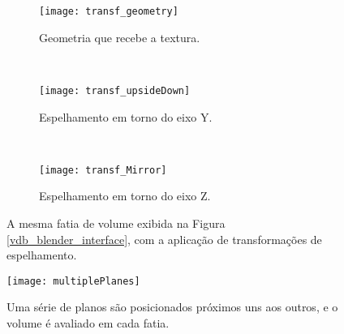 \begin{figure}[!htb]
        \centering
        \begin{subfigure}{0.3\textwidth}
                \texttt{[image: transf\_geometry]}
                \caption{Geometria que recebe a textura.}
                \label{fig:vdb_trans1}
        \end{subfigure}%
        ~ %
        \begin{subfigure}{0.3\textwidth}
                \texttt{[image: transf\_upsideDown]}
                \caption{Espelhamento em torno do eixo Y.}
                \label{fig:vdb_trans2}
        \end{subfigure}
        ~ %
        \begin{subfigure}{0.3\textwidth}
                \texttt{[image: transf\_Mirror]}
                \caption{Espelhamento em torno do eixo Z.}
                \label{fig:vdb_trans3}
        \end{subfigure}
        \caption{A mesma fatia de volume exibida na Figura \ref{vdb_blender_interface}, com a aplicação de transformações de espelhamento.}\label{fig:vdb_trans}
\end{figure}


\begin{figure}[!htb]
\center
\texttt{[image: multiplePlanes]}
\caption{Uma série de planos são posicionados próximos uns aos outros, e o volume é avaliado em cada fatia.}
\label{planes}
\end{figure}

